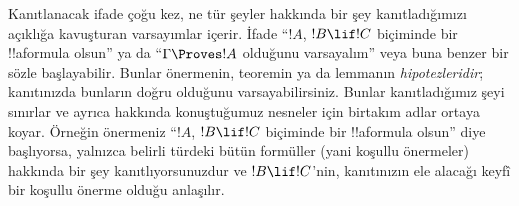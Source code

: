 Kanıtlanacak ifade çoğu kez, ne tür şeyler hakkında bir şey
kanıtladığımızı açıklığa kavuşturan varsayımlar içerir. İfade ``$!A$,
$!B \lif !C$ biçiminde bir !!a{formula} olsun'' ya da ``$\Gamma
\Proves !A$ olduğunu varsayalım'' veya buna benzer bir sözle
başlayabilir. Bunlar önermenin, teoremin ya da lemmanın
\emph{hipotezleridir}; kanıtınızda bunların doğru olduğunu
varsayabilirsiniz. Bunlar kanıtladığımız şeyi sınırlar ve ayrıca
hakkında konuştuğumuz nesneler için birtakım adlar ortaya koyar.
Örneğin önermeniz ``$!A$, $!B \lif !C$ biçiminde bir !!a{formula}
olsun'' diye başlıyorsa, yalnızca belirli türdeki bütün formüller
(yani koşullu önermeler) hakkında bir şey kanıtlıyorsunuzdur ve
$!B \lif !C$'nin, kanıtınızın ele alacağı keyfî bir koşullu önerme
olduğu anlaşılır.

